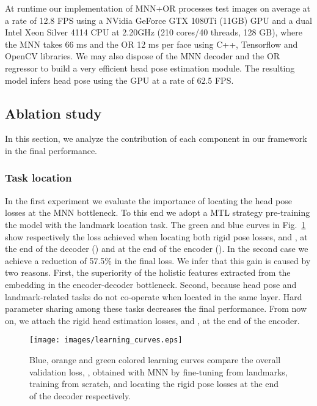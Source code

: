 \documentclass[9pt,technote,compsoc]{IEEEtran}
\begin{document}
At runtime our implementation of MNN+OR processes test images on average at a rate of 12.8 FPS using a NVidia GeForce GTX 1080Ti (11GB) GPU and a dual Intel Xeon Silver 4114 CPU at 2.20GHz (210 cores/40 threads, 128 GB), where the MNN takes 66 ms and the OR 12 ms per face using C++, Tensorflow and OpenCV libraries. 
We may also dispose of the MNN decoder and the OR regressor to build a very efficient head pose estimation module. The resulting model infers head pose using the GPU at a rate of 62.5 FPS.

\subsection{Ablation study}
\label{sec:subsection_ablation_multitask}

In this section, we analyze the contribution of each component in our framework in the final performance.


\subsubsection{Task location}

In the first experiment we evaluate the importance of locating the head pose losses at the MNN bottleneck. To this end we adopt a MTL strategy pre-training the model with the landmark location task. The green and blue curves in Fig.~\ref{fig:learning_curves} show respectively the loss achieved when locating both rigid pose losses,  and , at the end of the decoder () and at the end of the encoder (). 
In the second case we achieve a reduction of 57.5\% in the final loss. We infer that this gain is caused by two reasons. First, the superiority of the holistic features extracted from the embedding in the encoder-decoder bottleneck. Second, because head pose and landmark-related tasks do not co-operate when located in the same layer. Hard parameter sharing among these tasks decreases the final performance. 
From now on, we attach the rigid head estimation losses,  and , at the end of the encoder.

\begin{figure}
\centering
\texttt{[image: images/learning\_curves.eps]}
\caption{Blue, orange and green colored learning curves compare the overall validation loss, , obtained with MNN by fine-tuning from landmarks, training from scratch, and locating the rigid pose losses at the end of the decoder respectively.}
\label{fig:learning_curves}
\end{figure}
\end{document}
